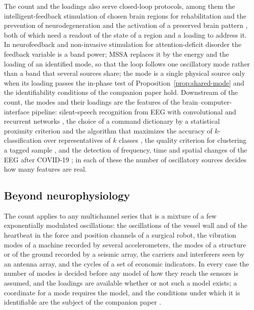 \documentclass{article}
\begin{document}
The count and the loadings also serve closed-loop protocols, among them the intelligent-feedback stimulation of chosen brain regions for rehabilitation and the prevention of neurodegeneration \cite{pat-feedback} and the activation of a preserved brain pattern \cite{pat-pattern}, both of which need a readout of the state of a region and a loading to address it. In neurofeedback and non-invasive stimulation for attention-deficit disorder \cite{ref-ADHD} the feedback variable is a band power; MSSA replaces it by the energy and the loading of an identified mode, so that the loop follows one oscillatory mode rather than a band that several sources share; the mode is a single physical source only when its loading passes the in-phase test of Proposition~\ref{prop:shared-mode} and the identifiability conditions of the companion paper hold. Downstream of the count, the modes and their loadings are the features of the brain--computer-interface pipeline: silent-speech recognition from EEG with convolutional and recurrent networks \cite{ref-Sensors}, the choice of a command dictionary by a statistical proximity criterion \cite{ref-CRMdict} and the algorithm that maximizes the accuracy of $k$-classification over representatives of $k$ classes \cite{ref-MathK, ref-DMA}, the quality criterion for clustering a tagged sample \cite{ref-ISCluster}, and the detection of frequency, time and spatial changes of the EEG after COVID-19 \cite{ref-CRMcovid, ref-ISCovid}; in each of these the number of oscillatory sources decides how many features are real.

\subsection{Beyond neurophysiology}\label{sec:beyond}

The count applies to any multichannel series that is a mixture of a few exponentially modulated oscillations: the oscillations of the vessel wall and of the heartbeat in the force and position channels of a surgical robot, the vibration modes of a machine recorded by several accelerometers, the modes of a structure or of the ground recorded by a seismic array, the carriers and interferers seen by an antenna array, and the cycles of a set of economic indicators. In every case the number of modes is decided before any model of how they reach the sensors is assumed, and the loadings are available whether or not such a model exists; a coordinate for a mode requires the model, and the conditions under which it is identifiable are the subject of the companion paper \cite{ref-companion}.
\end{document}
